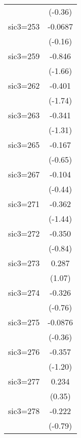 \begin{table}[htbp]
\begin{tabular*}{0.8\hsize}{@{\hskip\tabcolsep\extracolsep\fill}l*{1}{c}}
                    &     (-0.36)         \\
\addlinespace
sic3=253            &     -0.0687         \\
                    &     (-0.16)         \\
\addlinespace
sic3=259            &      -0.846         \\
                    &     (-1.66)         \\
\addlinespace
sic3=262            &      -0.401         \\
                    &     (-1.74)         \\
\addlinespace
sic3=263            &      -0.341         \\
                    &     (-1.31)         \\
\addlinespace
sic3=265            &      -0.167         \\
                    &     (-0.65)         \\
\addlinespace
sic3=267            &      -0.104         \\
                    &     (-0.44)         \\
\addlinespace
sic3=271            &      -0.362         \\
                    &     (-1.44)         \\
\addlinespace
sic3=272            &      -0.350         \\
                    &     (-0.84)         \\
\addlinespace
sic3=273            &       0.287         \\
                    &      (1.07)         \\
\addlinespace
sic3=274            &      -0.326         \\
                    &     (-0.76)         \\
\addlinespace
sic3=275            &     -0.0876         \\
                    &     (-0.36)         \\
\addlinespace
sic3=276            &      -0.357         \\
                    &     (-1.20)         \\
\addlinespace
sic3=277            &       0.234         \\
                    &      (0.35)         \\
\addlinespace
sic3=278            &      -0.222         \\
                    &     (-0.79)         \\

\end{tabular*}
\end{table}
